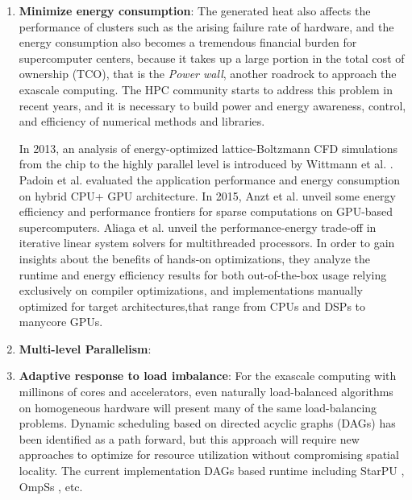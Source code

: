 \begin{enumerate}
	\item \textbf{Minimize energy consumption}: The generated heat also affects the performance of clusters such as the arising failure rate of hardware, and the energy consumption also becomes a tremendous financial burden for supercomputer centers, because it takes up a large portion in the total cost of ownership (TCO), that is the \textit{Power wall}, another roadrock to approach the exascale computing. The HPC community starts to address this problem in recent years, and it is necessary to build power and energy awareness, control, and efficiency of numerical methods and libraries. 
	
	In 2013, an analysis of energy-optimized lattice-Boltzmann CFD simulations from the chip to the highly parallel level is introduced by Wittmann et al. \cite{wittmann2013analysis}. Padoin et al. \cite{padoin2013evaluating} evaluated the application performance and energy consumption on hybrid CPU+ GPU architecture. In 2015, Anzt et al. \cite{anzt2015energy} unveil some energy efficiency and performance frontiers for sparse computations on GPU-based supercomputers. Aliaga et al. \cite{aliaga2015unveiling} unveil the performance-energy trade-off in iterative linear system solvers for multithreaded processors. In order to gain insights about the benefits of hands-on optimizations, they analyze the runtime and energy efficiency results for both out-of-the-box usage relying exclusively on compiler optimizations, and implementations manually optimized for target architectures,that range from CPUs and DSPs to manycore GPUs.
	
	\item \textbf{Multi-level Parallelism}: 
	
	\item \textbf{Adaptive response to load imbalance}: For the exascale computing with millinons of cores and accelerators, even naturally load-balanced algorithms on homogeneous hardware will present many of the same load-balancing problems. Dynamic scheduling based on directed acyclic graphs (DAGs) has been identified as a path forward, but this approach will require new approaches to optimize for resource utilization without compromising spatial locality. The current implementation DAGs based runtime including StarPU \cite{augonnet2011starpu}, OmpSs \cite{duran2011ompss}, etc.
	

\end{enumerate}
